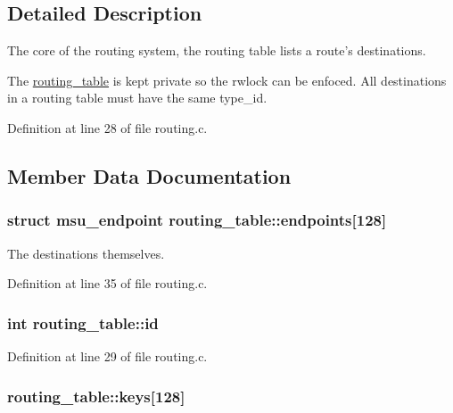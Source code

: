 \subsection{Detailed Description}
The core of the routing system, the routing table lists a route's destinations. 

The \hyperlink{structrouting__table}{routing\-\_\-table} is kept private so the rwlock can be enfoced. All destinations in a routing table must have the same type\-\_\-id. 

Definition at line 28 of file routing.\-c.



\subsection{Member Data Documentation}
\hypertarget{structrouting__table_a14e060336471c2720efcb502bdf0bce7}{
\subsubsection[{endpoints}]{\setlength{\rightskip}{0pt plus 5cm}struct {\bf msu\-\_\-endpoint} routing\-\_\-table\-::endpoints\mbox{[}128\mbox{]}}}\label{structrouting__table_a14e060336471c2720efcb502bdf0bce7}


The destinations themselves. 



Definition at line 35 of file routing.\-c.

\hypertarget{structrouting__table_a162359f4da0f31c95df59e2b51670d83}{
\subsubsection[{id}]{\setlength{\rightskip}{0pt plus 5cm}int routing\-\_\-table\-::id}}\label{structrouting__table_a162359f4da0f31c95df59e2b51670d83}


Definition at line 29 of file routing.\-c.

\hypertarget{structrouting__table_a488c5e77937df1e40c4b918093e50793}{
\subsubsection[{keys}]{ routing\-\_\-table\-::keys\mbox{[}128\mbox{]}}}\label{structrouting__table_a488c5e77937df1e40c4b918093e50793}


